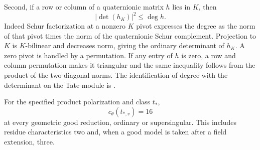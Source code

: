 Second, if a row or column of a quaternionic matrix $h$ lies in $K$, then
\begin{equation}
\label{eq:schur-bound}
 |\det(h_K)|^2\leq\deg h.
\end{equation}
Indeed Schur factorization at a nonzero $K$ pivot expresses the degree as the norm of that pivot times the norm of the quaternionic Schur complement.  Projection to $K$ is $K$-bilinear and decreases norm, giving the ordinary determinant of $h_K$.  A zero pivot is handled by a permutation.  If any entry of $h$ is zero, a row and column permutation makes it triangular and the same inequality follows from the product of the two diagonal norms.  The identification of degree with the determinant on the Tate module is \cite[Proposition 12.9]{MilneAV}.

\begin{theorem}
\label{thm:P13}
For the specified product polarization and class $t_*$,
\[
                         c_\theta(t_{*,v})=16
\]
at every geometric good reduction, ordinary or supersingular.  This includes residue characteristics two and, when a good model is taken after a field extension, three.
\end{theorem}

